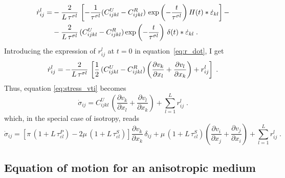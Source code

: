 \begin{equation}
\allowdisplaybreaks
    \begin{split}
    \dot{r}_{ij}^l = &-\frac{2}{L\,\tau^{\sigma l}}\, \left[ -\frac{1}{\tau^{\sigma l}}(C_{ijkl}^U-C_{ijkl}^R)\,\exp\left(-\frac{t}{\tau^{\sigma l}}\right)H(t) \ast \dot{\varepsilon}_{kl} \right] - \\
    &- \frac{2}{L\,\tau^{\sigma l}}\,(C_{ijkl}^U-C_{ijkl}^R)\exp\left(-\frac{t}{\tau^{\sigma l}}\right)\,\delta(t) \ast \dot{\varepsilon}_{kl}\;.
    \end{split}
    \label{eq:r_dot}
\end{equation}
Introducing the expression of $r_{ij}^l$ at $t=0$ in equation~\ref{eq:r_dot}, I get
\begin{equation}
\allowdisplaybreaks
    \dot{r}_{ij}^l = - \frac{2}{L\,\tau^{\sigma l}}\,\left[ \frac{1}{2}\,(C_{ijkl}^U-C_{ijkl}^R)\left(\frac{\partial v_k}{\partial x_l}+\frac{\partial v_l}{\partial x_k}\right)+r_{ij}^l \right]\;.
    \label{eq:final_r_dot}
\end{equation}
Thus, equation \ref{eq:stress_vti} becomes
\begin{equation}
    \dot{\sigma}_{ij} = C_{ijkl}^U\,\left(\frac{\partial v_k}{\partial x_l}+\frac{\partial v_l}{\partial x_k}\right)+\sum_{l=1}^{L}r_{ij}^l\;.
    \label{eq:stress_vti_final}
\end{equation}
which, in the special case of isotropy, reads
\begin{equation}
    \dot \sigma_{ij} = \left[\pi\,(1+L\,\tau_{\varepsilon l}^P)-2\mu\,(1+L\,\tau_{\varepsilon l}^S)\right]\frac{\partial v_k}{\partial x_k}\,\delta_{ij} + \mu\,(1+L\,\tau_{\varepsilon l}^S)\left(\frac{\partial v_i}{\partial x_j}+\frac{\partial v_j}{\partial x_i}\right) + \sum_{l=1}^{L}r_{ij}^l\;.
\end{equation}

\subsection{Equation of motion for an anisotropic medium}
\label{ch:anisotropy}

